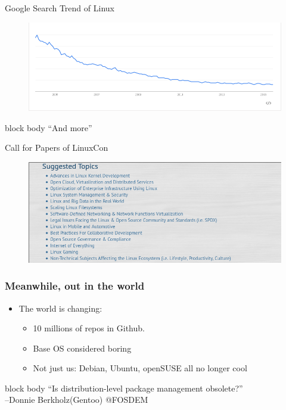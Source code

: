 \documentclass{beamer}
\begin{document}
\begin{frame}{Google Search Trend of Linux}
  \begin{figure}[htbp]
    \centering
    \includegraphics[width=\textwidth]{Search_Linux.png}
  \end{figure}
\end{frame}

\begin{frame}
  \begin{beamercolorbox}[center,ht=2ex,dp=0.5ex,rounded=true]{block body}
    {\centering ``And more''}
  \end{beamercolorbox}
\end{frame}

\begin{frame}{Call for Papers of LinuxCon}
  \begin{figure}[htbp]
    \centering
    \includegraphics[width=\textwidth]{cfp.png}
  \end{figure}
\end{frame}

\begin{frame}
  \frametitle{Meanwhile, out in the world}
  \begin{itemize}
    \item The world is changing:
      \begin{itemize}
        \item 10 millions of repos in Github.
        \item Base OS considered boring
        \item Not just us: Debian, Ubuntu, openSUSE all \alert{no
          longer cool}
      \end{itemize}
  \end{itemize}
  \begin{beamercolorbox}[center,ht=4ex,dp=0.5ex,rounded=true]{block body}
    {\centering ``Is distribution-level package management
    obsolete?''\\ --Donnie Berkholz(Gentoo) @FOSDEM}
  \end{beamercolorbox}
\end{frame}
\end{document}
